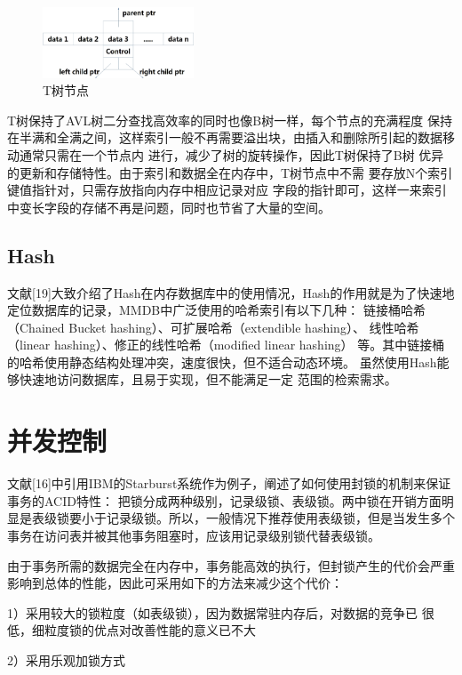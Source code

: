 \documentclass[literaturereview]{zjutreport}
\begin{document}
\begin{figure}[htbp]
\centering
\includegraphics[width=0.4\textwidth]{treenode}
\caption{T树节点}\label{fig:treenode}
\vspace{\baselineskip}
\end{figure}

T树保持了AVL树二分查找高效率的同时也像B树一样，每个节点的充满程度
保持在半满和全满之间，这样索引一般不再需要溢出块，由插入和删除所引起的数据移动通常只需在一个节点内
进行，减少了树的旋转操作，因此T树保持了B树
优异的更新和存储特性。由于索引和数据全在内存中，T树节点中不需
要存放N个索引键值指针对，只需存放指向内存中相应记录对应
字段的指针即可，这样一来索引中变长字段的存储不再是问题，同时也节省了大量的空间。

\subsection{Hash}
文献[19]大致介绍了Hash在内存数据库中的使用情况，Hash的作用就是为了快速地定位数据库的记录，MMDB中广泛使用的哈希索引有以下几种：
链接桶哈希（Chained Bucket hashing）、可扩展哈希（extendible hashing）、
线性哈希（linear hashing）、修正的线性哈希（modified linear hashing）
等。其中链接桶的哈希使用静态结构处理冲突，速度很快，但不适合动态环境。
虽然使用Hash能够快速地访问数据库，且易于实现，但不能满足一定
范围的检索需求。

\section{并发控制}
文献[16]中引用IBM的Starburst系统作为例子，阐述了如何使用封锁的机制来保证事务的ACID特性：
把锁分成两种级别，记录级锁、表级锁。两中锁在开销方面明显是表级锁要小于记录级锁。所以，一般情况下推荐使用表级锁，但是当发生多个事务在访问表并被其他事务阻塞时，应该用记录级别锁代替表级锁。

由于事务所需的数据完全在内存中，事务能高效的执行，但封锁产生的代价会严重影响到总体的性能，因此可采用如下的方法来减少这个代价：

1）采用较大的锁粒度（如表级锁），因为数据常驻内存后，对数据的竞争已
很低，细粒度锁的优点对改善性能的意义已不大

2）采用乐观加锁方式
\end{document}
